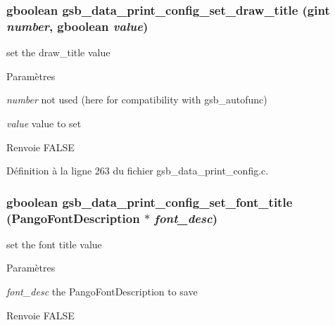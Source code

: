 \subsubsection[{gsb\_\-data\_\-print\_\-config\_\-set\_\-draw\_\-title}]{\setlength{\rightskip}{0pt plus 5cm}gboolean gsb\_\-data\_\-print\_\-config\_\-set\_\-draw\_\-title (gint {\em number}, \/  gboolean {\em value})}\label{gsb__data__print__config_8h_a8d6dcd2b99ea76bfb003da07439fee75}
set the draw\_\-title value


\begin{DoxyParams}{Paramètres}
\item[{\em number}]not used (here for compatibility with gsb\_\-autofunc) \item[{\em value}]value to set\end{DoxyParams}
\begin{DoxyReturn}{Renvoie}
FALSE 
\end{DoxyReturn}


Définition à la ligne 263 du fichier gsb\_\-data\_\-print\_\-config.c.

\subsubsection[{gsb\_\-data\_\-print\_\-config\_\-set\_\-font\_\-title}]{\setlength{\rightskip}{0pt plus 5cm}gboolean gsb\_\-data\_\-print\_\-config\_\-set\_\-font\_\-title (PangoFontDescription $\ast$ {\em font\_\-desc})}\label{gsb__data__print__config_8h_a2829de8cc372604bb83ad2f7e80e2ee6}
set the font title value


\begin{DoxyParams}{Paramètres}
\item[{\em font\_\-desc}]the PangoFontDescription to save\end{DoxyParams}
\begin{DoxyReturn}{Renvoie}
FALSE 
\end{DoxyReturn}


